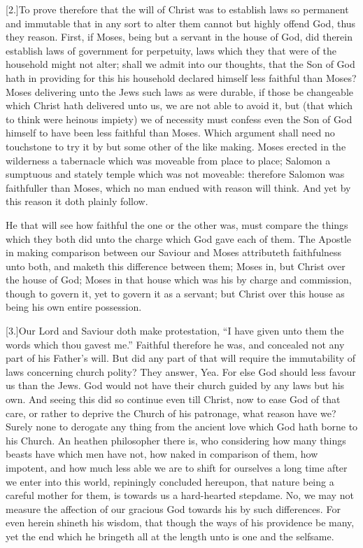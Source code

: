 [2.]To prove therefore that the will of Christ was to establish laws so permanent and immutable that in any sort to alter them cannot but highly offend God, thus they reason. First, if Moses, being but a servant in the house of God,  did therein establish laws of government for perpetuity, laws which they that were of the household might not alter; shall we admit into our thoughts, that the Son of God hath in providing for this his household declared himself less faithful than Moses? Moses delivering unto the Jews such laws as were durable, if those be changeable which Christ hath delivered unto us, we are not able to avoid it, but (that which to think were heinous impiety) we of necessity must confess even the Son of God himself to have been less faithful than Moses. Which argument shall need no touchstone to try it by but some other of the like making. Moses erected in the wilderness a tabernacle which was moveable from place to place; Salomon a sumptuous and stately temple which was not moveable: therefore Salomon was faithfuller than Moses, which no man endued with reason will think. And yet by this reason it doth plainly follow.

He that will see how faithful the one or the other was, must compare the things which they both did unto the charge which God gave each of them. The Apostle in making comparison between our Saviour and Moses attributeth faithfulness unto both, and maketh this difference between them; Moses in, but Christ over the house of God; Moses in that house which was his by charge and commission, though to govern it, yet to govern it as a servant; but Christ over this house as being his own entire possession.

[3.]Our Lord and Saviour doth make protestation, “I have given unto them the words which thou gavest me.” Faithful therefore he was, and concealed not any part of his Father’s will. But did any part of that will require the immutability of laws concerning church polity? They answer, Yea. For else God should less favour us than the Jews. God would not have their church guided by any laws but his  own. And seeing this did so continue even till Christ, now to ease God of that care, or rather to deprive the Church of his patronage, what reason have we? Surely none to derogate any thing from the ancient love which God hath borne to his Church. An heathen philosopher there is, who considering how many things beasts have which men have not, how naked in comparison of them, how impotent, and how much less able we are to shift for ourselves a long time after we enter into this world, repiningly concluded hereupon, that nature being a careful mother for them, is towards us a hard-hearted stepdame. No, we may not measure the affection of our gracious God towards his by such differences. For even herein shineth his wisdom, that though the ways of his providence be many, yet the end which he bringeth all at the length unto is one and the selfsame.

